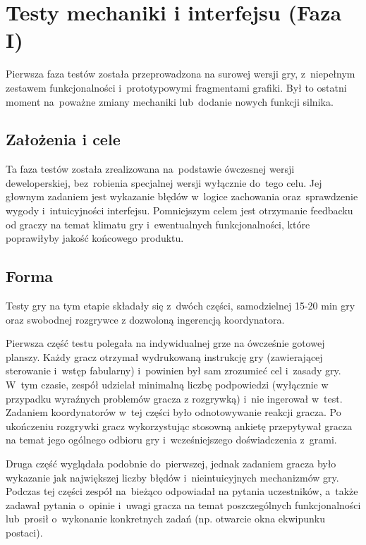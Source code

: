 \documentclass[licencjacka]{pracamgr}
\begin{document}
    \section{Testy mechaniki i interfejsu (Faza I)}
    Pierwsza faza testów została przeprowadzona na surowej wersji gry,
    z~niepełnym zestawem funkcjonalności i~prototypowymi fragmentami grafiki.
    Był to ostatni moment na~poważne zmiany mechaniki lub~dodanie nowych funkcji silnika.

      \subsection{Założenia i cele}
      Ta faza testów została zrealizowana na~podstawie ówczesnej wersji deweloperskiej,
      bez~robienia specjalnej wersji wyłącznie do~tego celu. Jej głownym zadaniem jest
      wykazanie błędów w~logice zachowania oraz~sprawdzenie wygody i~intuicyjności interfejsu.
      Pomniejszym celem jest otrzymanie feedbacku od graczy na temat klimatu gry
      i~ewentualnych funkcjonalności, które poprawiłyby jakość końcowego produktu.

      \subsection{Forma}
      Testy gry na tym etapie składały się z~dwóch części, samodzielnej 15-20 min gry
      oraz swobodnej rozgrywce z dozwoloną ingerencją koordynatora.

      Pierwsza część testu polegała na indywidualnej grze na ówcześnie gotowej planszy.
      Każdy gracz otrzymał wydrukowaną instrukcję gry (zawierającej sterowanie i~wstęp fabularny)
      i~powinien był sam zrozumieć cel i~zasady gry. W~tym czasie, zespół udzielał minimalną liczbę
      podpowiedzi (wyłącznie w przypadku wyraźnych problemów gracza z rozgrywką) i~nie ingerował w~test.
      Zadaniem koordynatorów w~tej części było odnotowywanie reakcji gracza.
      Po ukończeniu rozgrywki gracz wykorzystując stosowną ankietę przepytywał gracza na temat
      jego ogólnego odbioru gry i~wcześniejszego doświadczenia z~grami.

      Druga część wyglądała podobnie do~pierwszej, jednak zadaniem gracza było wykazanie
      jak największej liczby błędów i~nieintuicyjnych mechanizmów gry.
      Podczas tej części zespół na~bieżąco odpowiadał na pytania uczestników,
      a~także zadawał pytania o~opinie i~uwagi gracza na temat poszczególnych funkcjonalności
      lub~prosił o~wykonanie konkretnych zadań (np. otwarcie okna ekwipunku postaci).
\end{document}
